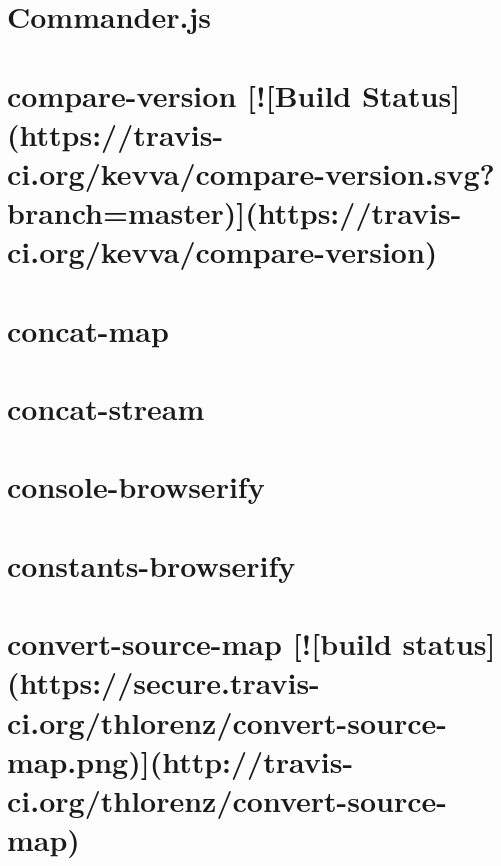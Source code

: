 \documentclass[twoside]{book}
\newcommand{\+}{\discretionary{\mbox{\scriptsize$\hookleftarrow$}}{}{}}
\begin{document}
\chapter{Commander.\+js}
\label{md_dsmacc_examples_DRmerge_node_modules_commander_Readme}

\chapter{compare-\/version \mbox{[}!\mbox{[}Build Status\mbox{]}(https\+://travis-\/ci.org/kevva/compare-\/version.svg?branch=master)\mbox{]}(https\+://travis-\/ci.org/kevva/compare-\/version)}
\label{md_dsmacc_examples_DRmerge_node_modules_compare-version_README}

\chapter{concat-\/map}
\label{md_dsmacc_examples_DRmerge_node_modules_concat-map_README}

\chapter{concat-\/stream}
\label{md_dsmacc_examples_DRmerge_node_modules_concat-stream_readme}

\chapter{console-\/browserify}
\label{md_dsmacc_examples_DRmerge_node_modules_console-browserify_README}

\chapter{constants-\/browserify}
\label{md_dsmacc_examples_DRmerge_node_modules_constants-browserify_README}

\chapter{convert-\/source-\/map \mbox{[}!\mbox{[}build status\mbox{]}(https\+://secure.travis-\/ci.org/thlorenz/convert-\/source-\/map.png)\mbox{]}(http\+://travis-\/ci.org/thlorenz/convert-\/source-\/map)}
\label{md_dsmacc_examples_DRmerge_node_modules_convert-source-map_README}

\end{document}
